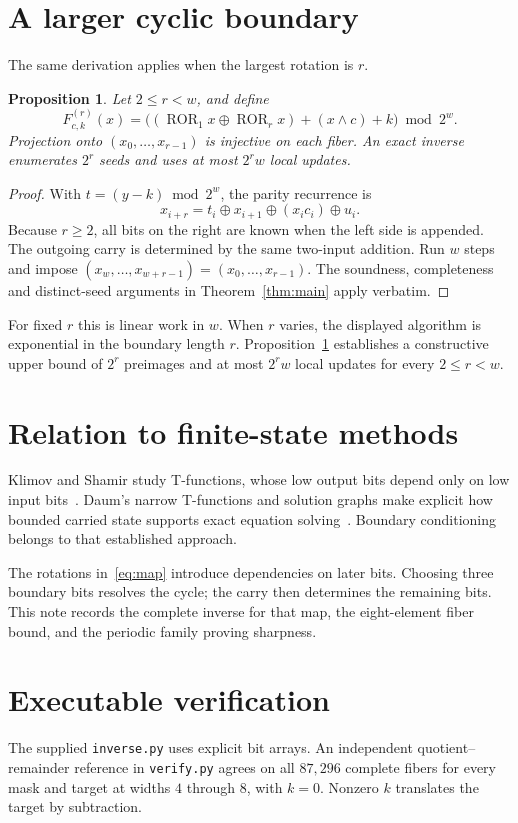 \documentclass[11pt,a4paper]{article}
\newtheorem{proposition}[theorem]{Proposition}
\newcommand{\xor}{\mathbin{\oplus}}
\DeclareMathOperator{\ROR}{ROR}
\begin{document}
\section{A larger cyclic boundary}
The same derivation applies when the largest rotation is $r$.

\begin{proposition}\label{prop:general}
Let $2\le r<w$, and define
\[
 F^{(r)}_{c,k}(x)=
 \bigl((\ROR_1x\xor\ROR_rx)+(x\land c)+k\bigr)\bmod2^w.
\]
Projection onto $(x_0,\ldots,x_{r-1})$ is injective on each fiber. An exact inverse enumerates $2^r$ seeds and uses at most $2^r w$ local updates.
\end{proposition}

\begin{proof}
With $t=(y-k)\bmod2^w$, the parity recurrence is
\[
 x_{i+r}=t_i\xor x_{i+1}\xor(x_ic_i)\xor u_i.
\]
Because $r\ge2$, all bits on the right are known when the left side is appended. The outgoing carry is determined by the same two-input addition. Run $w$ steps and impose
$(x_w,\ldots,x_{w+r-1})=(x_0,\ldots,x_{r-1})$.
The soundness, completeness and distinct-seed arguments in Theorem~\ref{thm:main} apply verbatim.
\end{proof}

For fixed $r$ this is linear work in $w$. When $r$ varies, the displayed algorithm is exponential in the boundary length $r$. Proposition~\ref{prop:general} establishes a constructive upper bound of $2^r$ preimages and at most $2^r w$ local updates for every $2\le r<w$.

\section{Relation to finite-state methods}
Klimov and Shamir study T-functions, whose low output bits depend only on low input bits~\cite{klimovshamir}. Daum's narrow T-functions and solution graphs make explicit how bounded carried state supports exact equation solving~\cite{daum}. Boundary conditioning belongs to that established approach.

The rotations in~\eqref{eq:map} introduce dependencies on later bits. Choosing three boundary bits resolves the cycle; the carry then determines the remaining bits. This note records the complete inverse for that map, the eight-element fiber bound, and the periodic family proving sharpness.

\section{Executable verification}
The supplied \texttt{inverse.py} uses explicit bit arrays. An independent quotient--remainder reference in \texttt{verify.py} agrees on all $87{,}296$ complete fibers for every mask and target at widths $4$ through $8$, with $k=0$. Nonzero $k$ translates the target by subtraction.
\end{document}
